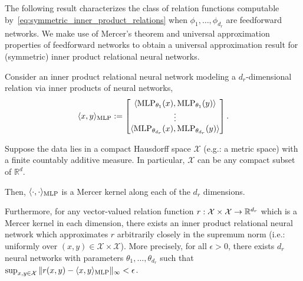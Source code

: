 The following result characterizes the class of relation functions computable by~\eqref{eq:symmetric_inner_product_relations} when \(\phi_{1}, \ldots, \phi_{d_r}\) are feedforward networks. We make use of Mercer's theorem and universal approximation properties of feedforward networks to obtain a universal approximation result for (symmetric) inner product relational neural networks.


\begin{thm}
	\label{theorem:function_class_inner_product_relnn}
	\hphantom{~}

	Consider an inner product relational neural network modeling a \(d_r\)-dimensional relation via inner products of neural networks,
	\begin{equation*}
		\langle x, y \rangle_{\text{MLP}} := \begin{bmatrix}\langle \text{MLP}_{\theta_1}(x), \text{MLP}_{\theta_1}(y) \rangle \\ \vdots \\ \langle \text{MLP}_{\theta_{d_r}}(x), \text{MLP}_{\theta_{d_r}}(y) \rangle\end{bmatrix}.
	\end{equation*}

	Suppose the data lies in a compact Hausdorff space \(\mathcal{X}\) (e.g.: a metric space) with a finite countably additive measure. In particular, \(\mathcal{X}\) can be any compact subset of \(\mathbb{R}^d\).

	Then, \(\langle \cdot, \cdot \rangle_{\text{MLP}}\) is a Mercer kernel along each of the \(d_r\) dimensions.

	Furthermore, for any vector-valued relation function \(r: \mathcal{X} \times \mathcal{X} \to \mathbb{R}^{d_r}\) which is a Mercer kernel in each dimension, there exists an inner product relational neural network which approximates \(r\) arbitrarily closely in the supremum norm (i.e.: uniformly over \((x,y) \in \mathcal{X}\times\mathcal{X}\)). More precisely, for all \(\epsilon > 0\), there exists \(d_r\) neural networks with parameters \(\theta_1, \ldots, \theta_{d_r}\) such that \(\sup_{x,y \in \mathcal{X}}{\lVert r(x,y) - \langle x, y \rangle_{\text{MLP}} \rVert_\infty} < \epsilon\).
\end{thm}

